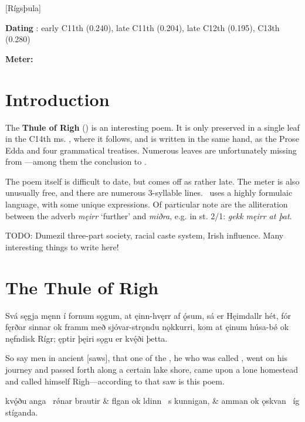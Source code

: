 [Rígsþula]
\def\thisBookCode{Rigsthula}

\begin{flushright}%
\textbf{Dating} \parencite{Sapp2022}: early C11th (0.240), late C11th (0.204), late C12th (0.195), C13th (0.280)

\textbf{Meter:} \Fornyrdislag%
\end{flushright}

\section{Introduction}

The \textbf{Thule of Righ} (\Rigsthula) is an interesting poem.  It is only preserved in a single leaf in the C14th ms. \Wormianus, where it follows, and is written in the same hand, as the Prose Edda and four grammatical treatises.  Numerous leaves are unfortunately missing from \Wormianus—among them the conclusion to \Rigsthula.

The poem itself is difficult to date, but comes off as rather late.  The meter is also unusually free, and there are numerous 3-syllable lines.  \Rigsthula\ uses a highly formulaic language, with some unique expressions.  Of particular note are the alliteration between the adverb \emph{męirr} ‘further’ and \emph{miðra}, e.g. in st. 2/1: \emph{gekk męirr at þat}.

TODO: Dumezil three-part society, racial caste system, Irish influence. Many interesting things to write here!

\sectionline

\section{The Thule of Righ}%

\bpg\bpa{}%
Svá sęgja męnn í fornum sǫgum, at ęinn-hvęrr af ǫ́sum, sá er Hęimdallr hét, fór fęrðar sinnar ok framm með sjóvar-strǫndu nǫkkurri, kom at ęinum húsa-bǿ ok nęfndisk Rígr; ęptir þęiri sǫgu er kvę́ði þetta.\epa

\bpb So say men in ancient [saws], that one of the , he who was called , went on his journey and passed forth along a certain lake shore, came upon a lone homestead and called himself Righ—according to that saw is this poem.\epb\epg


\bvg\bva{}%
 kvǫ́ðu anga \hld\ rǿnar brautir &
flgan ok ldinn \hld\ s kunnigan, &
amman ok ǫskvan \hld\ íg stíganda.\eva

